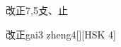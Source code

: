 \begin{entry}{改正}{7,5}{⽁、⽌}
  \begin{phonetics}{改正}{gai3 zheng4}[][HSK 4]
  \end{phonetics}
\end{entry}
